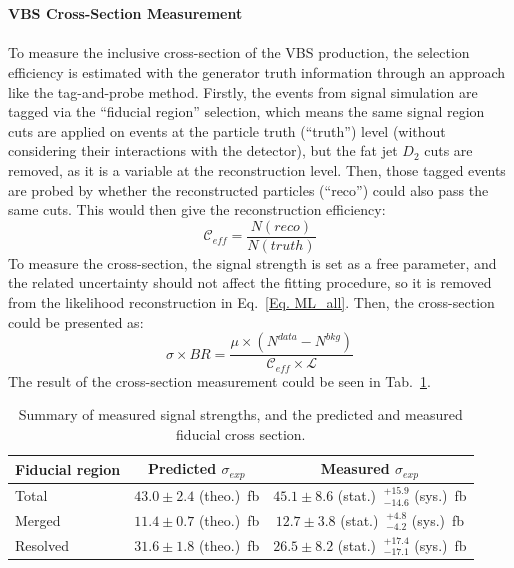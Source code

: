 \\
\\{\bf VBS Cross-Section Measurement}
\\
\\To measure the inclusive cross-section of the VBS production, the selection efficiency is estimated with the generator truth information through an approach like the tag-and-probe method. Firstly, the events from signal simulation are tagged via the ``fiducial region'' selection, which means the same signal region cuts are applied on events at the particle truth (``truth'') level (without considering their interactions with the detector), but the fat jet $D_2$ cuts are removed, as it is a variable at the reconstruction level. Then, those tagged events are probed by whether the reconstructed particles (``reco'') could also pass the same cuts. This would then give the reconstruction efficiency:
\begin{equation}
\mathcal{C}_{eff} = \frac{N(reco)}{N(truth)} 
\end{equation}  
To measure the cross-section, the signal strength is set as a free parameter, and the related uncertainty should not affect the fitting procedure, so it is removed from the likelihood reconstruction in Eq.~\ref{Eq. ML_all}. Then, the cross-section could be presented as:
\begin{equation}
\sigma\times BR=\frac{\mu\times (N^{data}-N^{bkg})}{\mathcal{C}_{eff}\times\mathcal{L}}
\end{equation}
The result of the cross-section measurement could be seen in Tab.~\ref{tab:obs_mu_fidxs}.
\begin{table}[htb] 
	\centering
	\begin{tabular}{lcc}
		\hline
		Fiducial region  & Predicted $\sigma_{exp} $  & Measured $\sigma_{exp}$ \\
		\hline
		Total    & $43.0 \pm 2.4 $ (theo.)~fb  &  $45.1 \pm 8.6$ (stat.) $~^{+15.9}_{-14.6}$ (sys.)~fb \\
		Merged   & $11.4  \pm 0.7 $ (theo.)~fb  & $12.7 \pm 3.8$ (stat.) $~^{+4.8}_{-4.2}$ (sys.)~fb \\
		Resolved & $31.6 \pm 1.8 $ (theo.)~fb  &  $26.5 \pm 8.2$ (stat.) $~^{+17.4}_{-17.1}$ (sys.)~fb \\
		\hline 
	\end{tabular}
	\caption{Summary of measured signal strengths, and the predicted and measured fiducial cross section.
	}
	\label{tab:obs_mu_fidxs}  
\end{table}

